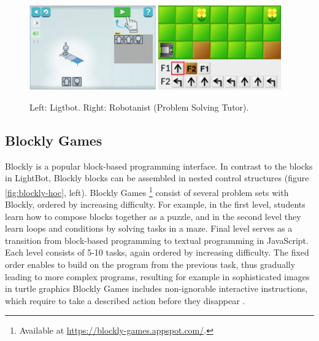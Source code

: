 \begin{figure}[htb]
\begin{center}
  \includegraphics[width=0.485\textwidth]{img/lightbot-instruction}
  \includegraphics[width=0.47\textwidth]{img/robotanist}
\end{center}
\caption{%
  Left: Ligtbot.
  Right: Robotanist (Problem Solving Tutor).}
\label{fig:lightbot-robotanist}
\end{figure}




\subsection{Blockly Games}
\label{sec:blockly-games}
Blockly is a popular block-based programming interface.
In contrast to the blocks in LightBot,
Blockly blocks can be assembled in nested control structures
(figure \ref{fig:blockly-hoc}, left).
Blockly Games%
\footnote{Available at \url{https://blockly-games.appspot.com/}.}
consist of several problem sets with Blockly, ordered by increasing difficulty.
For example, in the first level, students learn how to compose blocks together
as a puzzle, and in the second level they learn loops and conditions by solving
tasks in a maze. Final level serves as a transition from block-based
programming to textual programming in JavaScript.
Each level consists of 5-10 tasks, again ordered by increasing difficulty. %
The fixed order enables to build on the program from the previous task,
thus gradually leading to more complex programs,
resulting for example in sophisticated images in turtle graphics
Blockly Games includes non-ignorable interactive instructions,
which require to take a described action before they disappear
\cite{blockly-10-things}.

